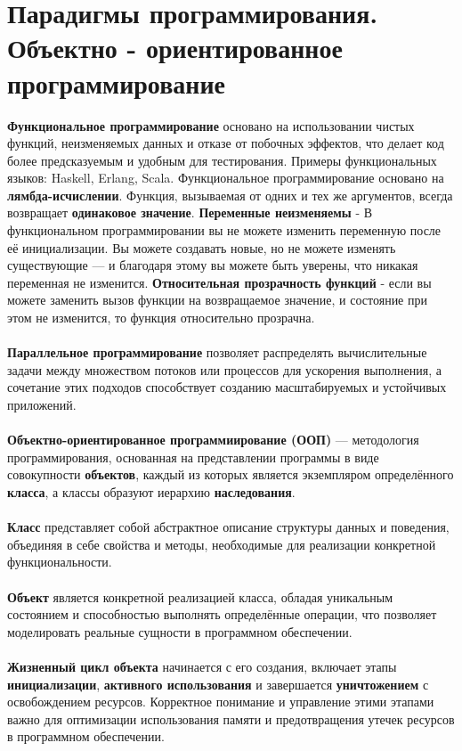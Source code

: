 \documentclass[a4paper, 12pt]{report}
\numberwithin{equation}{section}
\begin{document}
	\section{Парадигмы программирования. Объектно - ориентированное программирование}
	\textbf{Функциональное программирование} основано на использовании чистых функций, неизменяемых данных и отказе от побочных эффектов, что делает код более предсказуемым и удобным для тестирования. Примеры функциональных языков: Haskell, Erlang, Scala.
	Функциональное программирование основано на \textbf{лямбда-исчислении}.
	Функция, вызываемая от одних и тех же аргументов, всегда возвращает \textbf{одинаковое значение}.
	\textbf{Переменные неизменяемы} - В функциональном программировании вы не можете изменить переменную после её инициализации. Вы можете создавать новые, но не можете изменять существующие — и благодаря этому вы можете быть уверены, что никакая переменная не изменится.
	\textbf{Относительная прозрачность функций} - если вы можете заменить вызов функции на возвращаемое значение, и состояние при этом не изменится, то функция относительно прозрачна.
	\\\\
	\textbf{Параллельное программирование} позволяет распределять вычислительные задачи между множеством потоков или процессов для ускорения выполнения, а сочетание этих подходов способствует созданию масштабируемых и устойчивых приложений.
	\\\\
	\textbf{Объектно-ориентированное программиирование (ООП)} — методология
	программирования, основанная на представлении программы в виде совокупности \textbf{объектов}, каждый из которых является экземпляром определённого \textbf{класса}, а классы образуют иерархию \textbf{наследования}.
	\\\\
	\textbf{Класс} представляет собой абстрактное описание структуры данных и поведения, объединяя в себе свойства и методы, необходимые для реализации конкретной функциональности. 
	\\\\
	\textbf{Объект} является конкретной реализацией класса, обладая уникальным состоянием и способностью выполнять определённые операции, что позволяет моделировать реальные сущности в программном обеспечении.
	\\\\
	\textbf{Жизненный цикл объекта} начинается с его создания, включает этапы \textbf{инициализации}, \textbf{активного использования} и завершается \textbf{уничтожением} с освобождением ресурсов. Корректное понимание и управление этими этапами важно для оптимизации использования памяти и предотвращения утечек ресурсов в программном обеспечении.
\end{document}
